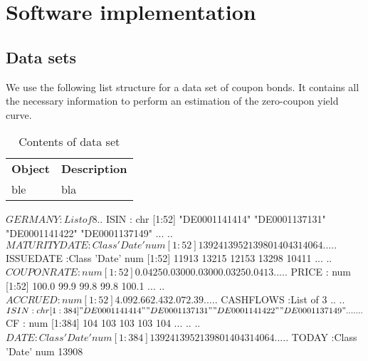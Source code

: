\section{Software implementation}

\subsection{Data sets}

We use the following list structure for a data set of coupon bonds. It contains all the necessary information to perform an estimation of the zero-coupon yield curve.

\begin{table}[htb]
  \centering
  \begin{tabular}[htb]{ll}
    \textbf{Object} & \textbf{Description} \\
ble & bla
  \end{tabular}
  \caption{Contents of data set}
\end{table}

 $ GERMANY:List of 8
  ..$ ISIN        : chr [1:52] "DE0001141414" "DE0001137131" "DE0001141422" "DE0001137149" ...
  ..$ MATURITYDATE:Class 'Date'  num [1:52] 13924 13952 13980 14043 14064 ...
  ..$ ISSUEDATE   :Class 'Date'  num [1:52] 11913 13215 12153 13298 10411 ...
  ..$ COUPONRATE  : num [1:52] 0.0425 0.0300 0.0300 0.0325 0.0413 ...
  ..$ PRICE       : num [1:52] 100.0  99.9  99.8  99.8 100.1 ...
  ..$ ACCRUED     : num [1:52] 4.09 2.66 2.43 2.07 2.39 ...
  ..$ CASHFLOWS   :List of 3
  .. ..$ ISIN: chr [1:384] "DE0001141414" "DE0001137131" "DE0001141422" "DE0001137149" ...
  .. ..$ CF  : num [1:384] 104 103 103 103 104 ...
  .. ..$ DATE:Class 'Date'  num [1:384] 13924 13952 13980 14043 14064 ...
  ..$ TODAY       :Class 'Date'  num 13908


